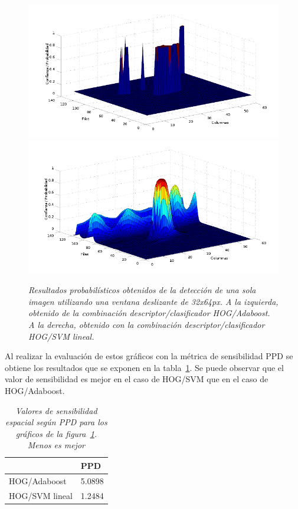 \begin{figure}[htc]
  \centering
  \includegraphics[scale=.25]{images/sig/boost/prueba}
  \includegraphics[scale=.25]{images/sig/svm/prueba}
  \caption{\em  Resultados probabilísticos obtenidos de la detección de una sola imagen utilizando una ventana deslizante de 32x64px. A la izquierda, obtenido de la combinación descriptor/clasificador HOG/Adaboost. A la derecha, obtenido con la combinación descriptor/clasificador HOG/SVM lineal.}  
  \label{fig:prueba2}
\end{figure}

Al realizar la evaluación de estos gráficos con la métrica de sensibilidad PPD se obtiene los resultados que se exponen en la tabla~\ref{tab:resp2}. Se puede observar que el valor de sensibilidad es mejor en el caso de HOG/SVM que en el caso de HOG/Adaboost.

\begin{table}[htc]
\centering
 \caption{\em  Valores de sensibilidad espacial según PPD para los gráficos de la figura~\ref{fig:prueba2}. Menos es mejor}  
  \label{tab:resp2}
\begin{tabular}{l|l|}
\cline{2-2}
                                      & PPD     \\ \hline
\multicolumn{1}{|l|}{HOG/Adaboost}    & 5.0898 \\ \hline
\multicolumn{1}{|l|}{HOG/SVM lineal} &  1.2484 \\ \hline
\end{tabular}
\end{table}

